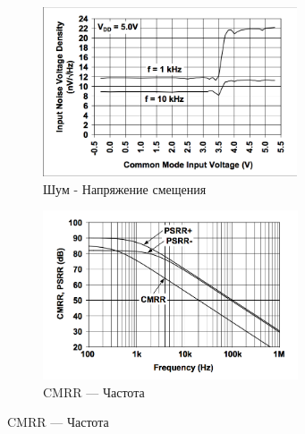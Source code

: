 \documentclass[../paper.tex]{subfiles}
\begin{document}
\begin{figure}[H]

\vspace{10mm} %
 
\begin{subfigure}{0.5\textwidth}
\includegraphics[width=0.9\linewidth, height=5cm]{images/op-amp-plot3.png} 
\caption{Шум - Напряжение смещения}
\end{subfigure}
\begin{subfigure}{0.5\textwidth}
\includegraphics[width=0.9\linewidth, height=5cm]{images/op-amp-plot4.png}
\caption{CMRR --- Частота}
\end{subfigure}

\vspace{10mm} %


\end{figure}
\end{document}
